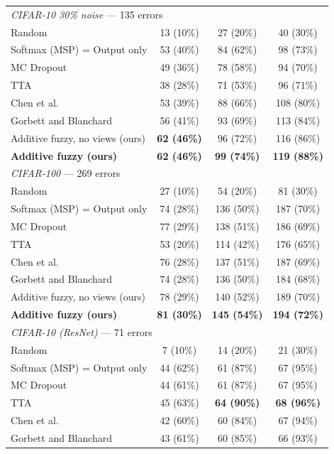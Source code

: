 \begin{table}[t]
{\begin{tabular}{lccc}
\multicolumn{4}{l}{\textit{CIFAR-10 30\% noise} --- 135 errors} \\
Random & 13 (10\%) & 27 (20\%) & 40 (30\%) \\
Softmax (MSP) = Output only & 53 (40\%) & 84 (62\%) & 98 (73\%) \\
MC Dropout & 49 (36\%) & 78 (58\%) & 94 (70\%) \\
TTA & 38 (28\%) & 71 (53\%) & 96 (71\%) \\
Chen et al.~\cite{chen2019} & 53 (39\%) & 88 (66\%) & 108 (80\%) \\
Gorbett and Blanchard~\cite{gorbett2022} & 56 (41\%) & 93 (69\%) & 113 (84\%) \\
Additive fuzzy, no views (ours) & \textbf{62 (46\%)} & 96 (72\%) & 116 (86\%) \\
\textbf{Additive fuzzy (ours)} & \textbf{62 (46\%)} & \textbf{99 (74\%)} & \textbf{119 (88\%)} \\
\midrule
\multicolumn{4}{l}{\textit{CIFAR-100} --- 269 errors} \\
Random & 27 (10\%) & 54 (20\%) & 81 (30\%) \\
Softmax (MSP) = Output only & 74 (28\%) & 136 (50\%) & 187 (70\%) \\
MC Dropout & 77 (29\%) & 138 (51\%) & 186 (69\%) \\
TTA & 53 (20\%) & 114 (42\%) & 176 (65\%) \\
Chen et al.~\cite{chen2019} & 76 (28\%) & 137 (51\%) & 187 (69\%) \\
Gorbett and Blanchard~\cite{gorbett2022} & 74 (28\%) & 136 (50\%) & 184 (68\%) \\
Additive fuzzy, no views (ours) & 78 (29\%) & 140 (52\%) & 189 (70\%) \\
\textbf{Additive fuzzy (ours)} & \textbf{81 (30\%)} & \textbf{145 (54\%)} & \textbf{194 (72\%)} \\
\midrule
\multicolumn{4}{l}{\textit{CIFAR-10 (ResNet)} --- 71 errors} \\
Random & 7 (10\%) & 14 (20\%) & 21 (30\%) \\
Softmax (MSP) = Output only & 44 (62\%) & 61 (87\%) & 67 (95\%) \\
MC Dropout & 44 (61\%) & 61 (87\%) & 67 (95\%) \\
TTA & 45 (63\%) & \textbf{64 (90\%)} & \textbf{68 (96\%)} \\
Chen et al.~\cite{chen2019} & 42 (60\%) & 60 (84\%) & 67 (94\%) \\
Gorbett and Blanchard~\cite{gorbett2022} & 43 (61\%) & 60 (85\%) & 66 (93\%) \\

\end{tabular}}
\end{table}
